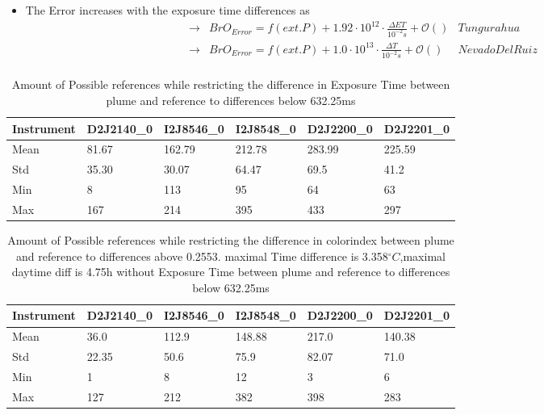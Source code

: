 \documentclass  [
  paper    = a4,
  BCOR     = 10mm,
  twoside,
  fontsize = 12pt,
  fleqn,
  toc      = bibnumbered,
  toc      = listofnumbered,
  numbers  = noendperiod,
  headings = normal,
  listof   = leveldown,
  version  = 3.03
]                                       {scrreprt}
\begin{document}
	\begin{itemize}
		\item The  Error increases with the exposure time differences as\\
		\begin{align*}
		\rightarrow&  BrO_{Error} = f(ext. P)+ 1.92\cdot10^{12}\cdot\frac{\Delta ET}{10^{-2}s} + \mathcal{O}\left(\right) & Tungurahua\\
		\rightarrow&  BrO_{Error} = f(ext. P)+ 1.0\cdot10^{13}\cdot\frac{\Delta T}{10^{-2}s} + \mathcal{O}\left(\right) & Nevado Del Ruiz\\
		\end{align*}
	\end{itemize}
	\begin{table}
	\begin{tabular}{|p{2cm}|p{2cm}|p{2cm}|p{2cm}|p{2cm}|p{2cm}|}
		Instrument	&D2J2140\_0&I2J8546\_0& I2J8548\_0&D2J2200\_0&D2J2201\_0\\
		\toprule
		Mean&81.67&162.79&212.78&283.99&225.59\\
		\midrule
		Std&
		35.30&
		30.07&
		64.47&
		69.5&
		41.2\\
		\midrule
		Min&8&113&95&64&63\\
		\midrule
		Max&167&214&395&433 &297\\
		\bottomrule
	\end{tabular}
	\caption{Amount of Possible references while restricting the difference in Exposure Time  between plume and reference to differences below 632.25ms}
	\label{tab:etrest}
\end{table}	

	\begin{table}
\begin{tabular}{|p{2cm}|p{2cm}|p{2cm}|p{2cm}|p{2cm}|p{2cm}|}
	Instrument	&D2J2140\_0&I2J8546\_0& I2J8548\_0&D2J2200\_0&D2J2201\_0\\
	\toprule
	Mean&36.0&112.9&148.88&217.0&140.38\\
	\midrule
	Std&
	22.35&
	50.6&
	75.9&
	82.07&
	71.0\\
	\midrule
	Min&1&8&12&3 &6\\
	\midrule
	Max&127&212&382&398 &283\\
	\bottomrule
\end{tabular}
\caption{Amount of Possible references while restricting the difference in colorindex  between plume and reference to differences above 0.2553. maximal Time difference is 3.358$^{\circ}C$,maximal daytime diff is 4.75h without Exposure Time  between plume and reference to differences below 632.25ms}
\end{table}	
\end{document}
